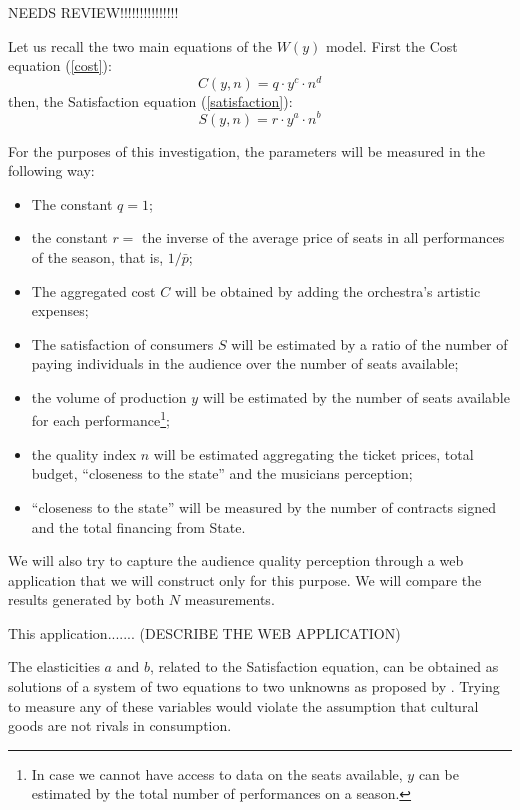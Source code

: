 \documentclass[a4paper, 12pt, openright, oneside, german, french, brazil, english]{abntex2}
\begin{document}
        NEEDS REVIEW!!!!!!!!!!!!!!!
        
        Let us recall the two main equations of the $W(y)$ model. First the Cost equation (\ref{cost}):
	$$C(y, n) = q \cdot y^c \cdot n^d$$
        then, the Satisfaction equation (\ref{satisfaction}):
        $$S(y, n) = r \cdot y^a \cdot n^b$$

        For the purposes of this investigation, the parameters will be measured in the following way:

        \begin{itemize}
        \item The constant $q = 1$;
        \item the constant $r =$ the inverse of the average price of seats in all performances of the season, that is, $1/\bar{p}$;
        \item The aggregated cost $C$ will be obtained by adding the orchestra's artistic expenses;
        \item The satisfaction of consumers $S$ will be estimated by a ratio of the number of paying individuals in the audience over the number of seats available;
        \item the volume of production $y$ will be estimated by the number of seats available for each performance\footnote{In case we cannot have access to data on the seats available, $y$ can be estimated by the total number of performances on a season.};
        \item the quality index $n$ will be estimated aggregating the ticket prices, total budget, ``closeness to the state'' and the musicians perception;
        \item ``closeness to the state'' will be measured by the number of contracts signed and the total financing from State.
        \end{itemize}

        We will also try to capture the audience quality perception through a web application that we will construct only for this purpose. We will compare the results generated by both $N$ measurements.

        This application....... (DESCRIBE THE WEB APPLICATION)

        The elasticities $a$ and $b$, related to the Satisfaction equation, can be obtained as solutions of a system of two equations to two unknowns as proposed by . Trying to measure any of these variables would violate the assumption that cultural goods are not rivals in consumption.
\end{document}
